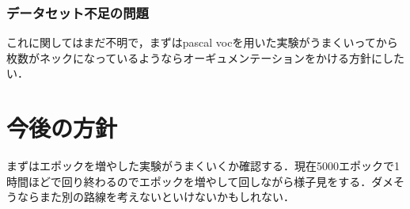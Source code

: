 \documentclass[onecolumn]{ujarticle}   %
\begin{document}
	\subsubsection{データセット不足の問題}
	これに関してはまだ不明で，まずはpascal vocを用いた実験がうまくいってから枚数がネックになっているようならオーギュメンテーションをかける方針にしたい．

	\section{今後の方針}
	まずはエポックを増やした実験がうまくいくか確認する．現在5000エポックで1時間ほどで回り終わるのでエポックを増やして回しながら様子見をする．ダメそうならまた別の路線を考えないといけないかもしれない．

	
\end{document}
